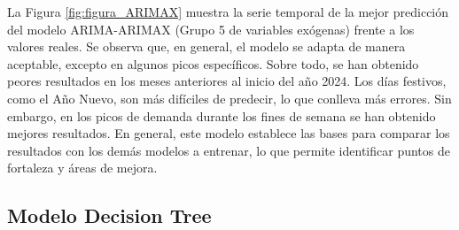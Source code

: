 \documentclass[12pt,a4paper]{report}
\begin{document}
La Figura \ref{fig:figura_ARIMAX} muestra la serie temporal de la mejor predicción del modelo ARIMA-ARIMAX (Grupo 5 de variables exógenas) frente a los valores reales. Se observa que, en general, el modelo se adapta de manera aceptable, excepto en algunos picos específicos. Sobre todo, se han obtenido peores resultados en los meses anteriores al inicio del año 2024. Los días festivos, como el Año Nuevo, son más difíciles de predecir, lo que conlleva más errores. Sin embargo, en los picos de demanda durante los fines de semana se han obtenido mejores resultados. En general, este modelo establece las bases para comparar los resultados con los demás modelos a entrenar, lo que permite identificar puntos de fortaleza y áreas de mejora.


\subsection{Modelo Decision Tree}
\end{document}
